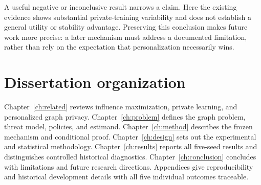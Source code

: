 A useful negative or inconclusive result narrows a claim. Here the existing evidence shows substantial private-training variability and does not establish a general utility or stability advantage. Preserving this conclusion makes future work more precise: a later mechanism must address a documented limitation, rather than rely on the expectation that personalization necessarily wins.

\section{Dissertation organization}
Chapter~\ref{ch:related} reviews influence maximization, private learning, and personalized graph privacy. Chapter~\ref{ch:problem} defines the graph problem, threat model, policies, and estimand. Chapter~\ref{ch:method} describes the frozen mechanism and conditional proof. Chapter~\ref{ch:design} sets out the experimental and statistical methodology. Chapter~\ref{ch:results} reports all five-seed results and distinguishes controlled historical diagnostics. Chapter~\ref{ch:conclusion} concludes with limitations and future research directions. Appendices give reproducibility and historical development details with all five individual outcomes traceable.
